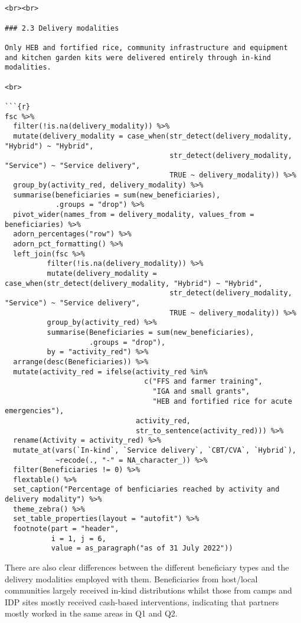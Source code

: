 \documentclass[
]{article}
\begin{document}
\begin{verbatim}


<br><br>

### 2.3 Delivery modalities

Only HEB and fortified rice, community infrastructure and equipment and kitchen garden kits were delivered entirely through in-kind modalities.

<br>

```{r}
fsc %>% 
  filter(!is.na(delivery_modality)) %>% 
  mutate(delivery_modality = case_when(str_detect(delivery_modality, "Hybrid") ~ "Hybrid", 
                                       str_detect(delivery_modality, "Service") ~ "Service delivery", 
                                       TRUE ~ delivery_modality)) %>% 
  group_by(activity_red, delivery_modality) %>% 
  summarise(beneficiaries = sum(new_beneficiaries), 
            .groups = "drop") %>% 
  pivot_wider(names_from = delivery_modality, values_from = beneficiaries) %>% 
  adorn_percentages("row") %>% 
  adorn_pct_formatting() %>% 
  left_join(fsc %>%
          filter(!is.na(delivery_modality)) %>%
          mutate(delivery_modality = case_when(str_detect(delivery_modality, "Hybrid") ~ "Hybrid", 
                                       str_detect(delivery_modality, "Service") ~ "Service delivery", 
                                       TRUE ~ delivery_modality)) %>%
          group_by(activity_red) %>%
          summarise(Beneficiaries = sum(new_beneficiaries), 
                    .groups = "drop"), 
          by = "activity_red") %>%
  arrange(desc(Beneficiaries)) %>%
  mutate(activity_red = ifelse(activity_red %in% 
                                 c("FFS and farmer training",
                                   "IGA and small grants", 
                                   "HEB and fortified rice for acute emergencies"), 
                               activity_red,
                               str_to_sentence(activity_red))) %>% 
  rename(Activity = activity_red) %>% 
  mutate_at(vars(`In-kind`, `Service delivery`, `CBT/CVA`, `Hybrid`), 
            ~recode(., "-" = NA_character_)) %>%
  filter(Beneficiaries != 0) %>% 
  flextable() %>% 
  set_caption("Percentage of benficiaries reached by activity and delivery modality") %>% 
  theme_zebra() %>% 
  set_table_properties(layout = "autofit") %>% 
  footnote(part = "header", 
           i = 1, j = 6, 
           value = as_paragraph("as of 31 July 2022"))
\end{verbatim}

There are also clear differences between the different beneficiary types
and the delivery modalities employed with them. Beneficiaries from
host/local communities largely received in-kind distributions whilst
those from camps and IDP sites mostly received cash-based interventions,
indicating that partners mostly worked in the same areas in Q1 and Q2.
\end{document}
